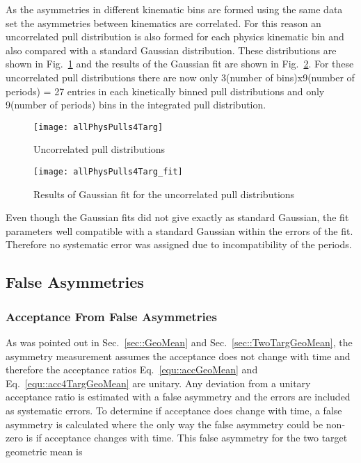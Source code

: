 \noindent
As the asymmetries in different kinematic bins are formed using the same data
set the asymmetries between kinematics are correlated.  For this reason an
uncorrelated pull distribution is also formed for each physics kinematic bin and
also compared with a standard Gaussian distribution.  These distributions are
shown in Fig.~\ref{fig::allPhysPulls4Targ} and the results of the Gaussian fit
are shown in Fig.~\ref{fig::allPhysPulls4Targ_fit}.  For these uncorrelated pull
distributions there are now only 3(number of bins)x9(number of periods) = 27
entries in each kinetically binned pull distributions and only 9(number of
periods) bins in the integrated pull distribution.

\begin{figure}[h!t]
  \begin{center}
    \texttt{[image: allPhysPulls4Targ]}
    \caption{Uncorrelated pull distributions}
    \label{fig::allPhysPulls4Targ}
  \end{center}
\end{figure}

\begin{figure}[h!t]
  \begin{center}
    \texttt{[image: allPhysPulls4Targ\_fit]}
    \caption{Results of Gaussian fit for the uncorrelated pull distributions}
    \label{fig::allPhysPulls4Targ_fit}
  \end{center}
\end{figure}

Even though the Gaussian fits did not give exactly as standard Gaussian, the fit
parameters well compatible with a standard Gaussian within the errors of the
fit.  Therefore no systematic error was assigned due to incompatibility of the
periods.

\subsection{False Asymmetries}
\subsubsection{Acceptance From False Asymmetries}
As was pointed out in Sec.~\ref{sec::GeoMean} and
Sec.~\ref{sec::TwoTargGeoMean}, the asymmetry measurement assumes the acceptance
does not change with time and therefore the acceptance ratios
Eq.~\ref{equ::accGeoMean} and Eq.~\ref{equ::acc4TargGeoMean} are unitary.  Any
deviation from a unitary acceptance ratio is estimated with a false asymmetry
and the errors are included as systematic errors.  To determine if acceptance
does change with time, a false asymmetry is calculated where the only way the
false asymmetry could be non-zero is if acceptance changes with time.  This
false asymmetry for the two target geometric mean is

